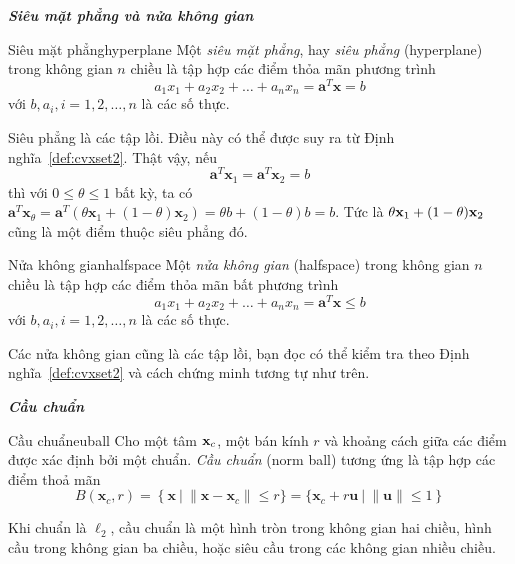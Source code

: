 \textit{\textbf{{Siêu mặt phẳng} và {nửa không gian}}}
\begin{mydef}{Siêu mặt phẳng}{hyperplane}
Một \textit{siêu mặt phẳng}, hay \textit{siêu phẳng} ({hyperplane}) trong
không gian $n$ chiều là tập hợp các điểm thỏa mãn phương trình
\begin{equation}
a_1 x_1 + a_2 x_2 + \dots + a_n x_n = \mathbf{a}^T\mathbf{x} = b
\end{equation}
với $b, a_i, i = 1, 2, \dots, n$ là các số thực.
\end{mydef}

Siêu phẳng là các {tập lồi}. Điều này có thể được suy ra từ Định
nghĩa~\ref{def:cvxset2}. Thật vậy, nếu
\begin{equation*}
\mathbf{a}^T\mathbf{x}_1 = \mathbf{a}^T\mathbf{x}_2 = b
\end{equation*}
thì với $0 \leq \theta \leq 1$ bất kỳ, ta có
\begin{math}
\mathbf{a}^T\mathbf{x}_{\theta} = \mathbf{a}^T(\theta \mathbf{x}_1 + (1 - \theta)\mathbf{x}_2) = \theta b + (1 - \theta) b  = b.
\end{math}
Tức là $\theta \mathbf{x}_1 + (1 - \theta)\mathbf{x}_2$ cũng là một điểm thuộc siêu phẳng đó.
\begin{mydef}{Nửa không gian}{halfspace}
Một \textit{nửa không gian} ({halfspace}) trong không gian $n$ chiều là
tập hợp các điểm thỏa mãn bất phương trình
\begin{equation*}
a_1 x_1 + a_2 x_2 + \dots + a_n x_n = \mathbf{a}^T\mathbf{x} \leq b
\end{equation*}
với $b, a_i, i = 1, 2, \dots, n$ là các số thực.
\end{mydef}

Các nửa không gian cũng là các tập lồi, bạn đọc có thể kiểm tra theo Định
nghĩa~\ref{def:cvxset2} và cách chứng minh tương tự như trên.

\textit{\textbf{Cầu chuẩn}}
\begin{mydef}{Cầu chuẩn}{euball}
Cho một tâm $\mathbf{x}_c$, một bán kính $r$ và khoảng cách giữa các điểm được
xác định bởi một chuẩn. \textit{Cầu chuẩn} (norm ball) tương ứng là tập hợp các điểm thoả
mãn
\begin{equation*}
B(\mathbf{x}_c, r) = \left\{\mathbf{x} ~\big|~ \|\mathbf{x} - \mathbf{x}_c\| \leq r \} = \{\mathbf{x}_c + r\mathbf{u} ~\big|~ \|\mathbf{u}\| \leq 1\right\}
\end{equation*}
\end{mydef}
Khi chuẩn là $\ell_2$, cầu chuẩn là một hình tròn trong không gian hai chiều,
hình cầu trong không gian ba chiều, hoặc siêu cầu trong các không gian nhiều
chiều. %

